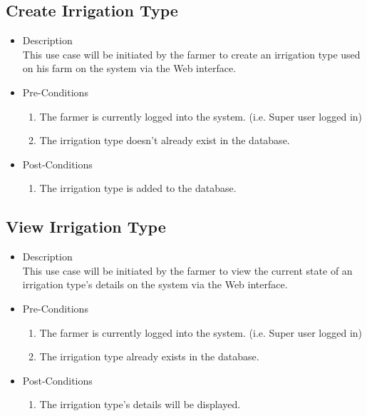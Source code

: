 \documentclass[11pt,fleqn]{book} %
\begin{document}
	\subsection{Create Irrigation Type}
	\begin{itemize}
		\item Description\\
		This use case will be initiated by the farmer to create an irrigation type used on his farm on the system via the Web interface.
		\item Pre-Conditions
		\begin{enumerate}
			\item The farmer is currently logged into the system. (i.e. Super user logged in)
			\item The irrigation type doesn’t already exist in the database. 
		\end{enumerate}
		\item Post-Conditions
		\begin{enumerate}
			\item The irrigation type is added to the database.	
		\end{enumerate}
	\end{itemize}
	
	\subsection{View Irrigation Type}
	\begin{itemize}
		\item Description\\
		This use case will be initiated by the farmer to view the current state of an irrigation type’s details on the system via the Web interface.
		\item Pre-Conditions
		\begin{enumerate}
			\item The farmer is currently logged into the system. (i.e. Super user logged in)
			\item The irrigation type already exists in the database.				
		\end{enumerate}
		\item Post-Conditions
		\begin{enumerate}
			\item The irrigation type’s details will be displayed.
		\end{enumerate}
	\end{itemize}
	
\end{document}
